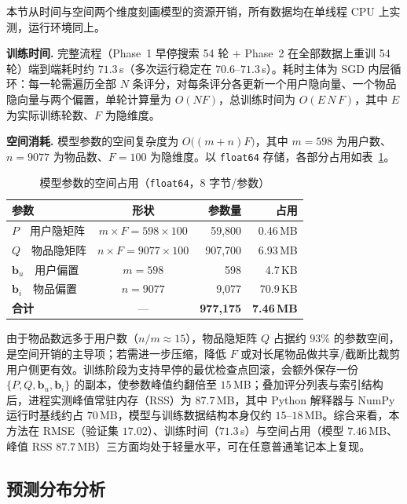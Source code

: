 \documentclass[UTF8,a4paper,10pt]{ctexart}
\begin{document}
本节从时间与空间两个维度刻画模型的资源开销，所有数据均在单线程 CPU 上实测，运行环境同上。

\textbf{训练时间.} 完整流程（Phase~1 早停搜索 54 轮 $+$ Phase~2 在全部数据上重训 54 轮）端到端耗时约 $71.3$\,s（多次运行稳定在 $70.6$--$71.3$\,s）。耗时主体为 SGD 内层循环：每一轮需遍历全部 $N$ 条评分，对每条评分各更新一个用户隐向量、一个物品隐向量与两个偏置，单轮计算量为 $O(NF)$，总训练时间为 $O(E\,N\,F)$，其中 $E$ 为实际训练轮数、$F$ 为隐维度。

\textbf{空间消耗.} 模型参数的空间复杂度为 $O\big((m+n)F\big)$，其中 $m{=}598$ 为用户数、$n{=}9077$ 为物品数、$F{=}100$ 为隐维度。以 \texttt{float64} 存储，各部分占用如表~\ref{tab:space}。

\begin{table}[H]
  \centering
  \caption{模型参数的空间占用（\texttt{float64}，$8$ 字节/参数）}
  \label{tab:space}
  \begin{tabular}{l c r r}
    \toprule
    \textbf{参数} & \textbf{形状} & \textbf{参数量} & \textbf{占用} \\
    \midrule
    $P$\ \ 用户隐矩阵 & $m\times F=598\times100$   & 59{,}800  & 0.46\,MB \\
    $Q$\ \ 物品隐矩阵 & $n\times F=9077\times100$  & 907{,}700 & 6.93\,MB \\
    $\mathbf{b}_u$\ \ 用户偏置 & $m=598$            & 598       & 4.7\,KB \\
    $\mathbf{b}_i$\ \ 物品偏置 & $n=9077$           & 9{,}077   & 70.9\,KB \\
    \midrule
    \textbf{合计} & — & \textbf{977{,}175} & \textbf{7.46\,MB} \\
    \bottomrule
  \end{tabular}
\end{table}

由于物品数远多于用户数（$n/m\approx15$），物品隐矩阵 $Q$ 占据约 $93\%$ 的参数空间，是空间开销的主导项；若需进一步压缩，降低 $F$ 或对长尾物品做共享/截断比裁剪用户侧更有效。训练阶段为支持早停的最优检查点回滚，会额外保存一份 $\{P,Q,\mathbf b_u,\mathbf b_i\}$ 的副本，使参数峰值约翻倍至 $15$\,MB；叠加评分列表与索引结构后，进程实测峰值常驻内存（RSS）为 $\mathbf{87.7}$\,MB，其中 Python 解释器与 NumPy 运行时基线约占 $70$\,MB，模型与训练数据结构本身仅约 $15$--$18$\,MB。综合来看，本方法在 RMSE（验证集 $17.02$）、训练时间（$71.3$\,s）与空间占用（模型 $7.46$\,MB、峰值 RSS $87.7$\,MB）三方面均处于轻量水平，可在任意普通笔记本上复现。

\subsection{预测分布分析}
\end{document}
